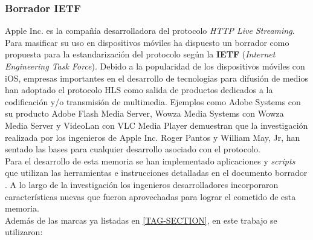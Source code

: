 \subsubsection{Borrador IETF}
Apple Inc. es la compañía desarrolladora del protocolo \textit{HTTP Live Streaming}. Para masificar su uso en dispositivos móviles ha dispuesto un borrador \cite{apple-draftpantos}  
como propuesta para la estandarización del protocolo según la \textbf{IETF} (\textit{Internet Engineering Task Force}).
Debido a la popularidad de los dispositivos móviles con iOS, empresas importantes en el desarrollo de tecnologias para difusión de medios han adoptado el protocolo HLS como salida de productos dedicados a la codificación y/o transmisión de multimedia. Ejemplos como Adobe Systems con su producto Adobe Flash Media Server, Wowza Media Systems con Wowza Media Server y VideoLan con VLC Media Player demuestran que la investigación realizada por los ingenieros de Apple Inc. Roger Pantos y William May, Jr, han sentado las bases para cualquier desarrollo asociado con el protocolo.\\

Para el desarrollo de esta memoria se han implementado aplicaciones y \textit{scripts} que utilizan las herramientas e instrucciones detalladas en el documento borrador \cite{apple-draftpantos}. A lo largo de la investigación los ingenieros desarrolladores incorporaron características nuevas que fueron aprovechadas para lograr el cometido de esta memoria.\\

Además de las marcas ya listadas en \ref{TAG-SECTION}, en este trabajo se utilizaron: 

